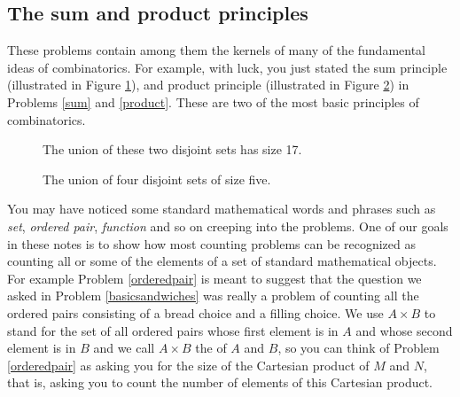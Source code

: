 \ep


\subsection{The sum and product principles} These problems
contain among them the kernels of many of the fundamental
ideas of combinatorics.   For example, with luck, you just  stated the sum principle (illustrated in Figure
\ref{sumprinc}), and product principle (illustrated in Figure
\ref{prodprinc}) in Problems
\ref{sum} and
\ref{product}.    These are two of the most basic
principles of combinatorics.  
\begin{figure}[htb]\caption{The union of these
two disjoint sets has size 17.}\label{sumprinc}\smallskip
\begin{center}\mbox{}
\end{center}  
\end{figure}
\begin{figure}[htb]\caption{The
union of four disjoint sets of size
five.}\label{prodprinc}\smallskip
\begin{center}\mbox{}
\end{center}  
\end{figure}


You may have noticed some standard mathematical words and
phrases such as {\em set}, {\em ordered pair}, {\em function}
and so on creeping into the problems.  One of our goals in
these notes is to show how most counting problems can
be recognized as counting all or some of the elements of a set
of standard mathematical objects.  For example Problem
\ref{orderedpair} is meant to suggest that the question we
asked in Problem \ref{basicsandwiches} was really a problem of
counting all the ordered pairs consisting of a bread choice
and a filling choice.  We use $A\times B$ to stand for the set
of all ordered pairs whose first element is in $A$ and whose
second element is in $B$ and we call $A\times B$ the
 of
$A$ and
$B$, so you can think of Problem
\ref{orderedpair} as asking you for the size of the Cartesian
product of
$M$ and $N$, that is, asking you to count the number of elements of
this Cartesian product.

